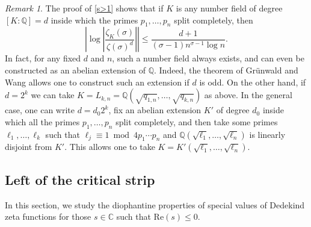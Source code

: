 \documentclass[10pt,a4paper]{amsart}
\theoremstyle{plain}
\theoremstyle{definition}
\theoremstyle{remark}
\newtheorem{remark}[theorem]{Remark}
\renewcommand{\mod}{\operatorname{mod}\ }
\begin{document}
    \begin{remark}
        The proof of \cref{s>1} shows that if $K$ is any number field of degree $[K \colon \mathbb{Q}] = d$ inside which the primes $p_1,\dots,p_n$ split completely, then
        \[
            \left\lvert \log\left\lvert \frac{\zeta_K(\sigma)}{\zeta(\sigma)^d} \right\rvert \right\rvert \leq \frac{d+1}{(\sigma-1) n^{\sigma-1} \log n}.
        \]
        In fact, for any fixed $d$ and $n$, such a number field always exists, and can even be constructed as an abelian extension of $\mathbb{Q}$. Indeed, the theorem of Grünwald and Wang \cite[Theorem~9.2.8]{Neukirch_Schmidt_Wingberg_2008} allows one to construct such an extension if $d$ is odd. On the other hand, if $d = 2^k$ we can take $K = L_{k,n} = \mathbb{Q}(\sqrt{q_{1,n}},\dots,\sqrt{q_{k,n}})$ as above. In the general case, one can write $d = d_0 2^k$, fix an abelian extension $K'$ of degree $d_0$ inside which all the primes $p_1,\dots,p_n$ split completely, and then take some primes $\ell_1,\dots,\ell_k$ such that $\ell_j \equiv 1 \ \mod 4 p_1 \cdots p_n$ and $\mathbb{Q}(\sqrt{\ell_1},\dots,\sqrt{\ell_n})$ is linearly disjoint from $K'$. This allows one to take $K = K'(\sqrt{\ell_1},\dots,\sqrt{\ell_n})$.
    \end{remark}

\subsection{Left of the critical strip}\label{negative s}

    In this section, we study the diophantine properties of special values of Dedekind zeta functions for those $s \in \mathbb{C}$ such that $\mathrm{Re}(s) \leq 0$.
\end{document}
